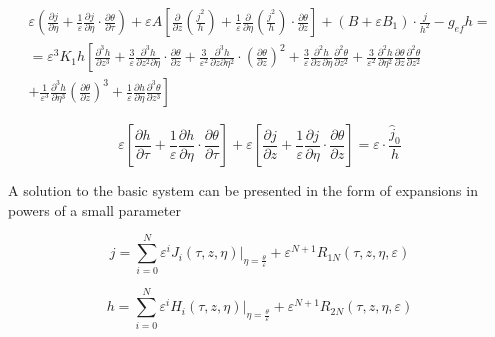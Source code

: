 \begin{multline*}
\varepsilon \left(
    \frac{\partial j}{\partial \eta}
    + \frac{1}{\varepsilon} \frac{\partial j}{\partial \eta} \cdot \frac{\partial \theta}{\partial \tau}
\right)
+ \varepsilon A \left[
    \frac{\partial}{\partial z} \left( \frac{j^2}{h} \right)
    + \frac{1}{\varepsilon} \frac{\partial}{\partial \eta} \left( \frac{j^2}{h} \right) \cdot \frac{\partial \theta}{\partial z}
\right]
+ \left( B + \varepsilon B_1 \right) \cdot \frac{j}{h^2}
- g_{\mathit{ef}} h =\\
= \varepsilon^3 K_1 h \left[
    \frac{\partial^3 h}{\partial z^3}
    + \frac{3}{\varepsilon} \frac{\partial^3 h}{\partial z^2 \partial \eta} \cdot \frac{\partial \theta}{\partial z}
    + \frac{3}{\varepsilon^2} \frac{\partial^3 h}{\partial z \partial \eta^2} \cdot \left( \frac{\partial \theta}{\partial z} \right)^2
    + \frac{3}{\varepsilon} \frac{\partial^2 h}{\partial z\, \partial \eta} \frac{\partial^2 \theta}{\partial z^2}
+ \frac{3}{\varepsilon^2} \frac{\partial^2 h}{\partial \eta^2} \frac{\partial \theta}{\partial z} \frac{\partial^2 \theta}{\partial z^2}\right.\\\left.
+ \frac{1}{\varepsilon^3} \frac{\partial^3 h}{\partial \eta^3} \left( \frac{\partial \theta}{\partial z} \right)^3
+ \frac{1}{\varepsilon} \frac{\partial h}{\partial \eta} \frac{\partial^3 \theta}{\partial z^3}
\right]
\end{multline*}

\begin{equation}
\varepsilon \left[ \frac{\partial h}{\partial \tau}
+ \frac{1}{\varepsilon} \frac{\partial h}{\partial \eta} \cdot \frac{\partial \theta}{\partial \tau} \right]
+ \varepsilon \left[ \frac{\partial j}{\partial z}
+ \frac{1}{\varepsilon} \frac{\partial j}{\partial \eta} \cdot \frac{\partial \theta}{\partial z} \right]
= \varepsilon \cdot \frac{\hat{j}_0}{h}
\end{equation}

A solution to the basic system can be presented in the form of
expansions in powers of a small parameter

\begin{equation}
j = \sum_{i=0}^{N} \varepsilon^i J_i(\tau, z, \eta) \bigg|_{\eta = \frac{\theta}{\varepsilon}} + \varepsilon^{N+1} R_{1N}(\tau, z, \eta, \varepsilon)
\end{equation}

\begin{equation}
h = \sum_{i=0}^{N} \varepsilon^i H_i(\tau, z, \eta) \bigg|_{\eta = \frac{\theta}{\varepsilon}} + \varepsilon^{N+1} R_{2N}(\tau, z, \eta, \varepsilon)
\end{equation}

